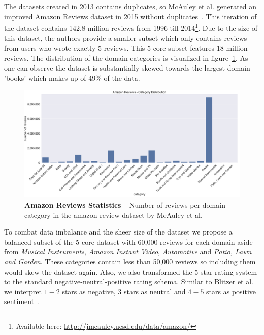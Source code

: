 The datasets created in 2013 contains duplicates, so McAuley et al. generated an improved Amazon Reviews dataset in 2015 without duplicates~\cite{McAuley2015}\cite{He2016}. This iteration of the dataset contains 142.8 million reviews from 1996 till 2014\footnote{Available here: \url{http://jmcauley.ucsd.edu/data/amazon/}}. Due to the size of this dataset, the authors provide a smaller subset which only contains reviews from users who wrote exactly 5 reviews. This 5-core subset features 18 million reviews. The distribution of the domain categories is visualized in figure~\ref{fig:05_amazonDatasetDistributin}. As one can observe the dataset is substantially skewed towards the largest domain 'books' which makes up of 49\% of the data.
\medskip

\begin{figure}
    \centering
    \includegraphics[width=\textwidth]{figures/05_setup/05_amazonReviewsCategories}
    \caption{\textbf{Amazon Reviews Statistics} -- Number of reviews per domain category in the amazon review dataset by McAuley et al.~\cite{McAuley2015}}
    \label{fig:05_amazonDatasetDistributin}
\end{figure}

To combat data imbalance and the sheer size of the dataset we propose a balanced subset of the 5-core dataset with 60,000 reviews for each domain aside from \textit{Musical Instruments}, \textit{Amazon Instant Video}, \textit{Automotive} and \textit{Patio, Lawn and Garden}. These categories contain less than 50,000 reviews so including them would skew the dataset again. Also, we also transformed the 5 star-rating system to the standard negative-neutral-positive rating schema. Similar to Blitzer et al. we interpret $1-2$ stars as negative, 3 stars as neutral and $4-5$ stars as positive sentiment~\cite{Blitzer2007}.
\medskip

